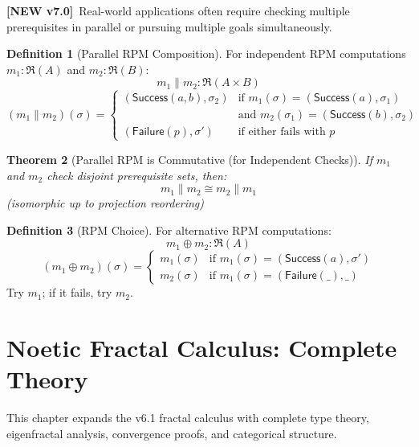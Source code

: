 \documentclass[11pt,twoside,openright]{book}
\theoremstyle{definition}
\newtheorem{definition}{Definition}[chapter]
\theoremstyle{plain}
\newtheorem{theorem}[definition]{Theorem}
\theoremstyle{remark}
\newcommand{\RPM}{\mathfrak{R}}
\newcommand{\pcomp}{\parallel}
\newcommand{\vnew}{\textcolor{blue!70!black}{\textbf{[NEW v7.0]}}}
\newcommand{\vexp}{\textcolor{green!50!black}{\textbf{[EXPANDED v7.0]}}}
\begin{document}
\vnew\ Real-world applications often require checking multiple prerequisites in parallel or pursuing multiple goals simultaneously.

\begin{definition}[Parallel RPM Composition]
\label{def:rpm-parallel}
For independent RPM computations $m_1 : \RPM(A)$ and $m_2 : \RPM(B)$:
\[
m_1 \pcomp m_2 : \RPM(A \times B)
\]
\[
(m_1 \pcomp m_2)(\sigma) =
\begin{cases}
(\mathsf{Success}(a, b), \sigma_2) & \text{if } m_1(\sigma) = (\mathsf{Success}(a), \sigma_1) \\
& \text{and } m_2(\sigma_1) = (\mathsf{Success}(b), \sigma_2) \\
(\mathsf{Failure}(p), \sigma') & \text{if either fails with } p
\end{cases}
\]
\end{definition}

\begin{theorem}[Parallel RPM is Commutative (for Independent Checks)]
\label{thm:rpm-parallel-comm}
If $m_1$ and $m_2$ check disjoint prerequisite sets, then:
\[
m_1 \pcomp m_2 \cong m_2 \pcomp m_1
\]
(isomorphic up to projection reordering)
\end{theorem}

\begin{definition}[RPM Choice]
\label{def:rpm-choice}
For alternative RPM computations:
\[
m_1 \oplus m_2 : \RPM(A)
\]
\[
(m_1 \oplus m_2)(\sigma) =
\begin{cases}
m_1(\sigma) & \text{if } m_1(\sigma) = (\mathsf{Success}(a), \sigma') \\
m_2(\sigma) & \text{if } m_1(\sigma) = (\mathsf{Failure}(\_), \_)
\end{cases}
\]
Try $m_1$; if it fails, try $m_2$.
\end{definition}


\chapter{Noetic Fractal Calculus: Complete Theory}
\label{ch:fractal-calculus}

\begin{tcolorbox}[colback=green!5!white,colframe=green!75!black,title=\vexp]
This chapter expands the v6.1 fractal calculus with complete type theory, eigenfractal analysis, convergence proofs, and categorical structure.
\end{tcolorbox}
\end{document}
